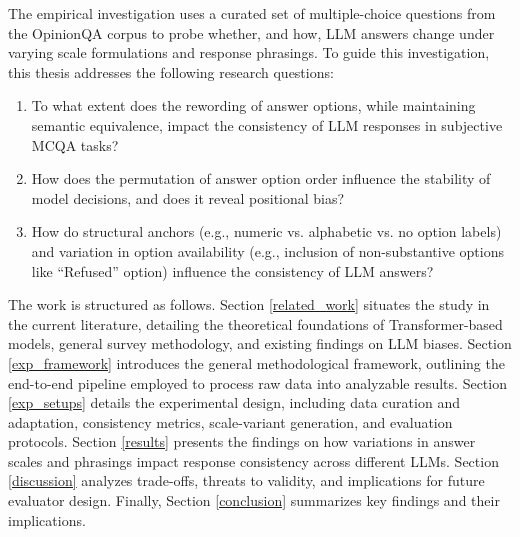 \vspace{0.2cm}
The empirical investigation uses a curated set of multiple-choice questions from the OpinionQA corpus \citep{santurkar2023opinionsQApaper} to probe whether, and how, LLM answers change under varying scale formulations and response phrasings. To guide this investigation, this thesis addresses the following research questions:
\begin{enumerate}
    \item To what extent does the rewording of answer options, while maintaining semantic equivalence, impact the consistency of LLM responses in subjective MCQA tasks?
    \item How does the permutation of answer option order influence the stability of model decisions, and does it reveal positional bias?
    \item How do structural anchors (e.g., numeric vs. alphabetic vs. no option labels) and variation in option availability (e.g., inclusion of non-substantive options like ``Refused'' option) influence the consistency of LLM answers?
\end{enumerate}

The work is structured as follows. Section \ref{related_work} situates the study in the current literature, detailing the theoretical foundations of Transformer-based models, general survey methodology, and existing findings on LLM biases.
Section \ref{exp_framework} introduces the general methodological framework, outlining the end-to-end pipeline employed to process raw data into analyzable results.
Section \ref{exp_setups} details the experimental design, including data curation and adaptation, consistency metrics, scale-variant generation, and evaluation protocols.
Section \ref{results} presents the findings on how variations in answer scales and phrasings impact response consistency across different LLMs.
Section \ref{discussion} analyzes trade-offs, threats to validity, and implications for future evaluator design.
Finally, Section \ref{conclusion} summarizes key findings and their implications.
